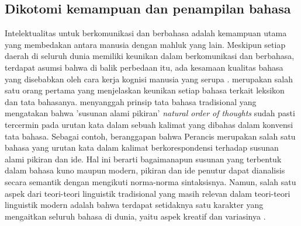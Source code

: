 \subsection{Dikotomi kemampuan dan penampilan bahasa}
Intelektualitas untuk berkomunikasi dan berbahasa adalah kemampuan utama yang membedakan antara manusia dengan mahluk yang lain. Meskipun setiap daerah di seluruh dunia memiliki keunikan dalam berkomunikasi dan berbahasa, terdapat asumsi bahwa di balik perbedaan itu, ada  kesamaan kualitas bahasa yang disebabkan oleh cara kerja kognisi manusia yang serupa \citep{sapir1921intro, chomsky1965syntactic}. \cite{beattie1788theory} merupakan salah satu orang pertama yang menjelaskan keunikan setiap bahasa terkait leksikon dan tata bahasanya. \cite{chomsky1965syntactic} menyanggah prinsip tata bahasa tradisional yang mengatakan bahwa 'susunan alami pikiran' \textit{natural order of thoughts} sudah pasti tercermin pada urutan kata dalam sebuah kalimat yang dibahas dalam konvensi tata bahasa. Sebagai contoh, \cite{diderot1751lettre} beranggapan bahwa Perancis merupakan salah satu bahasa yang urutan kata dalam kalimat berkorespondensi terhadap susunan alami pikiran dan ide. Hal ini berarti bagaimanapun susunan yang terbentuk dalam bahasa kuno maupun modern, pikiran dan ide penutur dapat dianalisis secara semantik dengan mengikuti norma-norma sintaksisnya. Namun, salah satu aspek dari teori-teori linguistik tradisional yang masih relevan dalam teori-teori linguistik modern adalah bahwa terdapat setidaknya satu karakter yang mengaitkan seluruh bahasa di dunia, yaitu aspek kreatif dan variasinya \citep{hawkins2014cross}.

